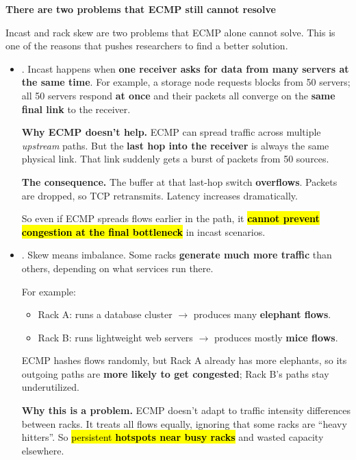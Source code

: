\newpage

\begin{flushleft}
    \textcolor{Red2}{ \textbf{There are two problems that ECMP still cannot resolve}}
\end{flushleft}
Incast and rack skew are two problems that ECMP alone cannot solve. This is one of the reasons that pushes researchers to find a better solution.
\begin{itemize}
    \item \label{def: Bursty Traffic - Incast} . Incast happens when \textbf{one receiver asks for data from many servers at the same time}. For example, a storage node requests blocks from 50 servers; all 50 servers respond \textbf{at once} and their packets all converge on the \textbf{same final link} to the receiver.

    \highspace
    \textcolor{Red2}{ \textbf{Why ECMP doesn't help.}} ECMP can spread traffic across multiple \emph{upstream} paths. But the \textbf{last hop into the receiver} is always the same physical link. That link suddenly gets a burst of packets from 50 sources.

    \highspace
    \textcolor{Red2}{ \textbf{The consequence.}} The buffer at that last-hop switch \textbf{overflows}. Packets are dropped, so TCP retransmits. Latency increases dramatically.

    \highspace
    So even if ECMP spreads flows earlier in the path, it \hl{\textbf{cannot prevent congestion at the final bottleneck}} in incast scenarios.


    \item {}. Skew means imbalance. Some racks \textbf{generate much more traffic} than others, depending on what services run there.
    
    For example:
    \begin{itemize}
        \item Rack A: runs a database cluster $\rightarrow$ produces many \textbf{elephant flows}.
        \item Rack B: runs lightweight web servers $\rightarrow$ produces mostly \textbf{mice flows}.
    \end{itemize}
    ECMP hashes flows randomly, but Rack A already has more elephants, so its outgoing paths are \textbf{more likely to get congested}; Rack B's paths stay underutilized.

    \highspace
    \textcolor{Red2}{ \textbf{Why this is a problem.}} ECMP doesn't adapt to traffic intensity differences between racks. It treats all flows equally, ignoring that some racks are ``heavy hitters''. So \hl{persistent \textbf{hotspots near busy racks}} and wasted capacity elsewhere.
\end{itemize}

